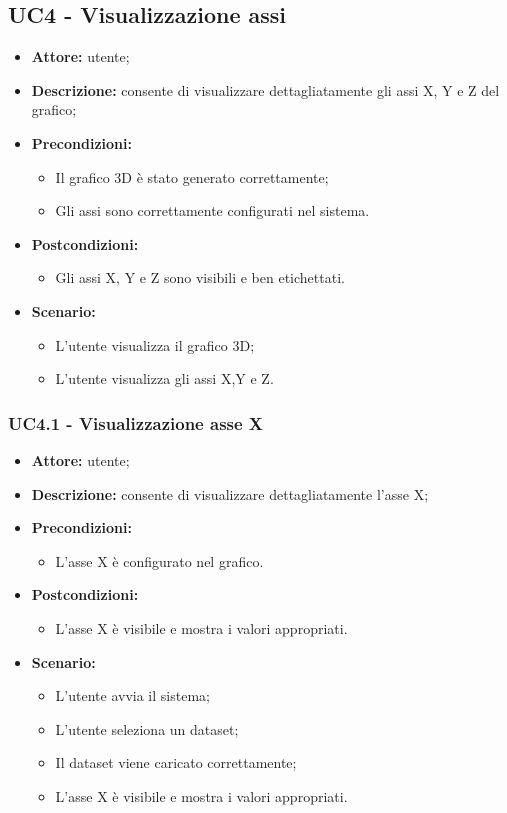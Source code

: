 \subsection{UC4 - Visualizzazione assi}
\begin{itemize}
    \item \textbf{Attore:} utente;
    \item \textbf{Descrizione:} consente di visualizzare dettagliatamente gli assi X, Y e Z del grafico;
    \item \textbf{Precondizioni:} 
    \begin{itemize}
        \item Il grafico 3D è stato generato correttamente;
        \item Gli assi sono correttamente configurati nel sistema.
    \end{itemize}
    \item \textbf{Postcondizioni:}
    \begin{itemize}
        \item Gli assi X, Y e Z sono visibili e ben etichettati.
    \end{itemize}
    \item \textbf{Scenario:}
    \begin{itemize}
        \item L'utente visualizza il grafico 3D;
        \item L'utente visualizza gli assi X,Y e Z.
    \end{itemize}

\end{itemize}
\subsubsection{UC4.1 - Visualizzazione asse X}
\begin{itemize}
    \item \textbf{Attore:} utente;
    \item \textbf{Descrizione:} consente di visualizzare dettagliatamente l'asse X;
    \item \textbf{Precondizioni:} 
    \begin{itemize}
        \item L'asse X è configurato nel grafico.
    \end{itemize}
    \item \textbf{Postcondizioni:} 
    \begin{itemize}
        \item L'asse X è visibile e mostra i valori appropriati.
    \end{itemize}
    \item \textbf{Scenario:} 
    \begin{itemize}
        \item L'utente avvia il sistema;
        \item L'utente seleziona un dataset;
        \item Il dataset viene caricato correttamente;
        \item L'asse X è visibile e mostra i valori appropriati.
    \end{itemize}
\end{itemize}
